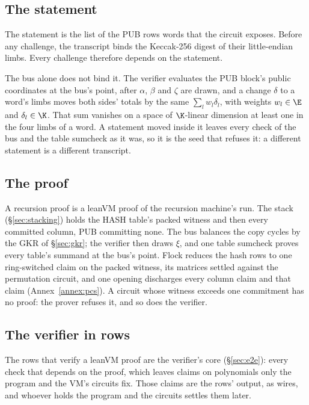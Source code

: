 \subsection{The statement}\label{rec:statement}

The statement is the list of the \textsf{PUB} rows\textquotesingle{} words that the circuit exposes. Before any challenge, the transcript binds the Keccak-256 digest of their little-endian limbs. Every challenge therefore depends on the statement.

The bus alone does not bind it. The verifier evaluates the \textsf{PUB} block's public coordinates at the bus's point, after $\alpha$, $\beta$ and $\zeta$ are drawn, and a change $\delta$ to a word's limbs moves both sides' totals by the same $\sum_l w_l\delta_l$, with weights $w_l\in\E$ and $\delta_l\in\K$. That sum vanishes on a space of $\K$-linear dimension at least one in the four limbs of a word. A statement moved inside it leaves every check of the bus and the table sumcheck as it was, so it is the seed that refuses it: a different statement is a different transcript.

\subsection{The proof}\label{rec:proof}

A recursion proof is a leanVM proof of the recursion machine's run. The stack (\S\ref{sec:stacking}) holds the \textsf{HASH} table's packed witness and then every committed column, \textsf{PUB} committing none. The bus balances the copy cycles by the GKR of \S\ref{sec:gkr}; the verifier then draws $\xi$, and one table sumcheck proves every table's summand at the bus's point. Flock reduces the hash rows to one ring-switched claim on the packed witness, its matrices settled against the permutation circuit, and one opening discharges every column claim and that claim (Annex~\ref{annex:pcs}). A circuit whose witness exceeds one commitment has no proof: the prover refuses it, and so does the verifier.

\subsection{The verifier in rows}\label{rec:verifier}

The rows that verify a leanVM proof are the verifier's core (\S\ref{sec:e2e}): every check that depends on the proof, which leaves claims on polynomials only the program and the VM's circuits fix. Those claims are the rows' output, as wires, and whoever holds the program and the circuits settles them later.

